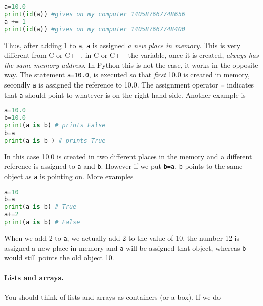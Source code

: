 \documentclass[graybox,sectrefs,envcountresetchap,open=right,final]{svmonodo}
\begin{document}
\begin{lstlisting}[language=python,style=blue1bar]
a=10.0
print(id(a)) #gives on my computer 140587667748656
a += 1
print(id(a)) #gives on my computer 140587667748400

\end{lstlisting}

Thus, after adding 1 to \texttt{a}, \texttt{a} is assigned \emph{a new place in memory}. This is very different from C or C++, in C or C++ the variable, once it is created, \emph{always has the same memory address}. In Python this is not the case, it works in the opposite way. The statement \texttt{a=10.0}, is executed so that \emph{first} 10.0 is created in memory, secondly \texttt{a} is assigned the reference to 10.0. The assignment operator \texttt{=} indicates that \texttt{a} should point to whatever is on the right hand side. Another example is     






\begin{lstlisting}[language=python,style=blue1bar]
a=10.0
b=10.0
print(a is b) # prints False
b=a
print(a is b ) # prints True

\end{lstlisting}

In this case 10.0 is created in two different places in the memory and a different reference is assigned to \texttt{a} and \texttt{b}. However if we put \texttt{b=a}, \texttt{b} points to the same object as \texttt{a} is pointing on. More examples






\begin{lstlisting}[language=python,style=blue1bar]
a=10
b=a
print(a is b) # True
a+=2
print(a is b) # False

\end{lstlisting}

When we add 2 to \texttt{a}, we actually add 2 to the value of 10, the number 12 is assigned a new place in memory and \texttt{a} will be assigned that object, whereas \texttt{b} would still points the old object 10.

\paragraph{Lists and arrays.}
You should think of lists and arrays as containers (or a box). If we do
\end{document}
